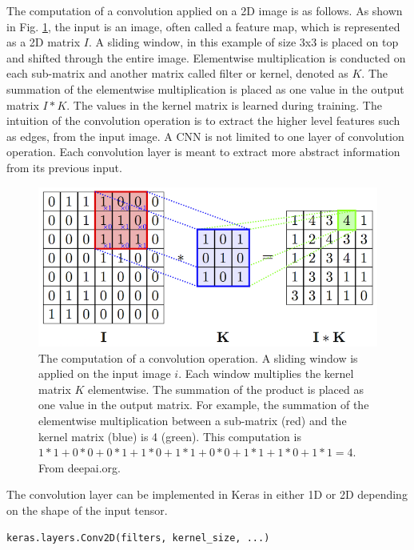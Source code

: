 The computation of a convolution applied on a 2D image is as follows. As shown in Fig. \ref{fig_Conv2d}, the input is an image, often called a feature map, which is represented as a 2D matrix $I$. A sliding window, in this example of size 3x3 is placed on top and shifted through the entire image. Elementwise multiplication is conducted on each sub-matrix and another matrix called filter or kernel, denoted as $K$. The summation of the elementwise multiplication is placed as one value in the output matrix $I*K$. The values in the kernel matrix is learned during training. The intuition of the convolution operation is to extract the higher level features such as edges, from the input image. A CNN is not limited to one layer of convolution operation. Each convolution layer is meant to extract more abstract information from its previous input.
\begin{figure}[h!]
\begin{center}
\includegraphics[width = 13cm]{img/convolution_computation.png}
\caption[The computation of a convolution operation]{The computation of a convolution operation. A sliding window is applied on the input image $i$. Each window multiplies the kernel matrix $K$ elementwise. The summation of the product is placed as one value in the output matrix. For example, the summation of the elementwise multiplication between a sub-matrix (red) and the kernel matrix (blue) is 4 (green). This computation is $1*1+0*0+0*1+1*0+1*1+0*0+1*1+1*0+1*1 = 4$.   From deepai.org. \label{fig_Conv2d}}
\end{center}
\end{figure}

The convolution layer can be implemented in Keras in either 1D or 2D depending on the shape of the input tensor.
\begin{lstlisting}[language=python,frame=single]
keras.layers.Conv2D(filters, kernel_size, ...)
\end{lstlisting}

